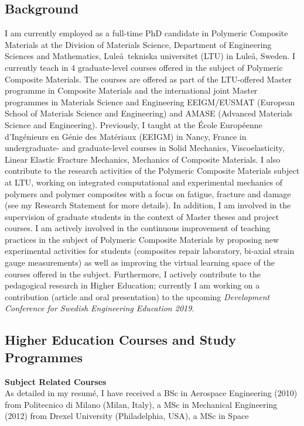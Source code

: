 \documentclass[
  a4paper, 
]{fortysecondscv}
\begin{document}
\makefrontsidebar

\subsection{Background}
I am currently employed as a full-time PhD candidate in Polymeric Composite Materials at the Division of Materials Science, Department of Engineering Sciences and Mathematics, Lule\aa\ tekniska universitet (LTU) in Lule\aa, Sweden. I currently teach in 4 graduate-level courses offered in the subject of Polymeric Composite Materials. The courses are offered as part of the LTU-offered Master programme in Composite Materials and the international joint Master programmes in Materials Science and Engineering EEIGM/EUSMAT (European School of Materials Science and Engineering) and AMASE (Advanced Materials Science and Engineering). Previously, I taught at the \'Ecole Europ\'eenne d'Ing\'enieurs en G\'enie des Mat\'eriaux (EEIGM) in Nancy, France in undergraduate- and graduate-level courses in Solid Mechanics, Viscoelasticity, Linear Elastic Fracture Mechanics, Mechanics of Composite Materials. I also contribute to the research activities of the Polymeric Composite Materials subject at LTU, working on integrated computational and experimental mechanics of polymers and polymer composites with a focus on fatigue, fracture and damage (see my Research Statement for more details). In addition, I am involved in the supervision of graduate students in the context of Master theses and project courses. I am actively involved in the continuous improvement of teaching practices in the subject of Polymeric Composite Materials by proposing new experimental activities for students (composites repair laboratory, bi-axial strain gauge measurements) as well as improving the virtual learning space of the courses offered in the subject. Furthermore, I actively contribute to the pedagogical research in Higher Education; currently I am working on a contribution (article and oral presentation) to the upcoming \textit{Development Conference for Swedish Engineering Education 2019}.

\subsection{Higher Education Courses and Study Programmes}
\textbf{Subject Related Courses}\\
As detailed in my resum\'e, I have received a BSc in Aerospace Engineering (2010) from Politecnico di Milano (Milan, Italy), a MSc in Mechanical Engineering (2012) from Drexel University (Philadelphia, USA), a MSc in Space
\end{document}
